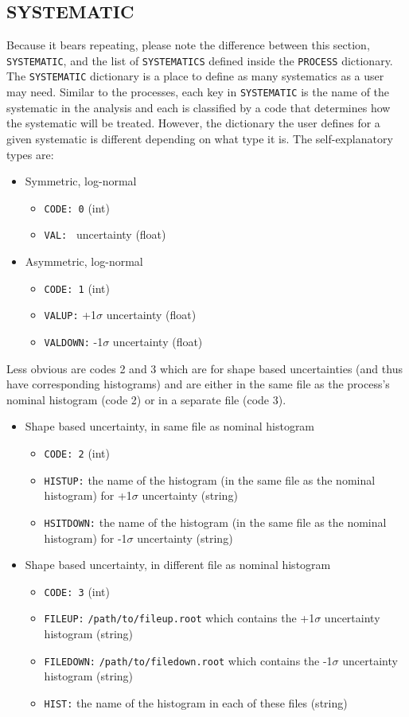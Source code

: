 \documentclass[letter]{article}
\begin{document}
	\subsection{SYSTEMATIC}
	Because it bears repeating, please note the difference between this section, \verb"SYSTEMATIC", and the list of \verb"SYSTEMATICS" defined inside the \verb"PROCESS" dictionary. The \verb"SYSTEMATIC" dictionary is a place to define as many systematics as a user may need. Similar to the processes, each key in \verb"SYSTEMATIC" is the name of the systematic in the analysis and each is classified by a code that determines how the systematic will be treated. However, the dictionary the user defines for a given systematic is different depending on what type it is. The self-explanatory types are:
	\begin{itemize}
		\item Symmetric, log-normal
		\begin{itemize}
			\item \verb"CODE: 0" (int)
			\item \verb"VAL: " uncertainty (float)
		\end{itemize}
		\item Asymmetric, log-normal
		\begin{itemize}
			\item \verb"CODE: 1" (int)
			\item \verb"VALUP:" +1$\sigma$ uncertainty (float)
			\item \verb"VALDOWN:" -1$\sigma$ uncertainty (float)
		\end{itemize}
	\end{itemize}
	Less obvious are codes 2 and 3 which are for shape based uncertainties (and thus have corresponding histograms) and are either in the same file as the process's nominal histogram (code 2) or in a separate file (code 3). 
	\begin{itemize}
		\item Shape based uncertainty, in same file as nominal histogram
		\begin{itemize}
			\item \verb"CODE: 2" (int)
			\item \verb"HISTUP:" the name of the histogram (in the same file as the nominal histogram) for +1$\sigma$ uncertainty (string)
			\item \verb"HSITDOWN:" the name of the histogram (in the same file as the nominal histogram) for -1$\sigma$ uncertainty (string)
		\end{itemize}
		\item Shape based uncertainty, in different file as nominal histogram
		\begin{itemize}
			\item \verb"CODE: 3" (int)
			\item \verb"FILEUP:" \verb"/path/to/fileup.root" which contains the +1$\sigma$ uncertainty histogram (string)
			\item \verb"FILEDOWN:" \verb"/path/to/filedown.root" which contains the -1$\sigma$ uncertainty histogram (string)
			\item \verb"HIST:" the name of the histogram in each of these files (string)
		\end{itemize}
	\end{itemize}
\end{document}

